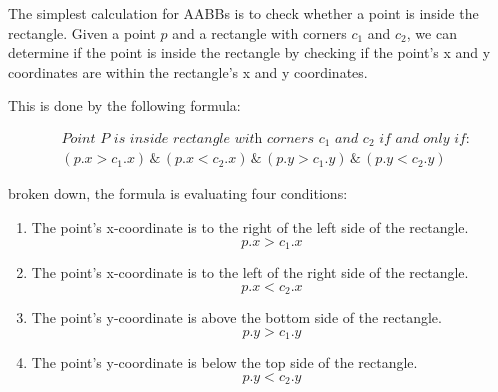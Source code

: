 \documentclass[10pt,a4paper]{article}
\renewcommand{\land}{\,\&\,}
\begin{document}
The simplest calculation for AABBs is to check whether a point is inside the
rectangle. Given a point $p$ and a rectangle with corners $c_1$ and $c_2$, we
can determine if the point is inside the rectangle by checking if the point's x
and y coordinates are within the rectangle's x and y coordinates.

This is done by the following formula:

\begin{equation}
    \begin{aligned}
         & \textit{Point $P$ is inside rectangle with corners $c_1$ and $c_2$ if and only if:} \\
         & (p.x > c_1.x) \land (p.x < c_2.x) \land (p.y > c_1.y) \land (p.y < c_2.y)
    \end{aligned}
\end{equation}

broken down, the formula is evaluating four conditions:
\begin{multicols}{2}
    \begin{enumerate}
        \item The point's x-coordinate is to the right of the left side of the rectangle.
              \begin{equation}
                  p.x > c_1.x
              \end{equation}

        \item The point's x-coordinate is to the left of the right side of the rectangle.
              \begin{equation}
                  p.x < c_2.x
              \end{equation}

        \item The point's y-coordinate is above the bottom side of the rectangle.
              \begin{equation}
                  p.y > c_1.y
              \end{equation}

        \item The point's y-coordinate is below the top side of the rectangle.
              \begin{equation}
                  p.y < c_2.y
              \end{equation}
    \end{enumerate}
\end{multicols}
\end{document}
